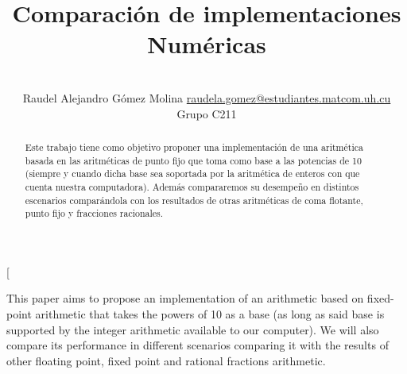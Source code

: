 \documentclass[a4paper,10pt,twocolumn]{article}
\title{Comparación de implementaciones Numéricas}
\author{\\
\name Raudel Alejandro Gómez Molina \email \href{mailto:raudela.gomez@estudiantes.matcom.uh.cu}{raudela.gomez@estudiantes.matcom.uh.cu}
	\\ \addr Grupo C211}
\begin{document}
\twocolumn[
	
	\maketitle
	
	
	\begin{abstract}

		Este trabajo tiene como objetivo proponer una implementación de una aritmética basada en las aritméticas de punto fijo que toma como base a las potencias de 10 (siempre y cuando dicha base sea soportada por la aritmética de enteros con que cuenta nuestra computadora). Además compararemos su desempeño en distintos escenarios comparándola con los resultados de otras aritméticas de coma flotante, punto fijo y fracciones racionales.
		
	\end{abstract}
	
	\vspace{0.5cm}
	
	\begin{enabstract}

		This paper aims to propose an implementation of an arithmetic based on fixed-point arithmetic that takes the powers of 10 as a base (as long as said base is supported by the integer arithmetic available to our computer). We will also compare its performance in different scenarios comparing it with the results of other floating point, fixed point and rational fractions arithmetic.
		
	\end{enabstract}
	
\end{document}
